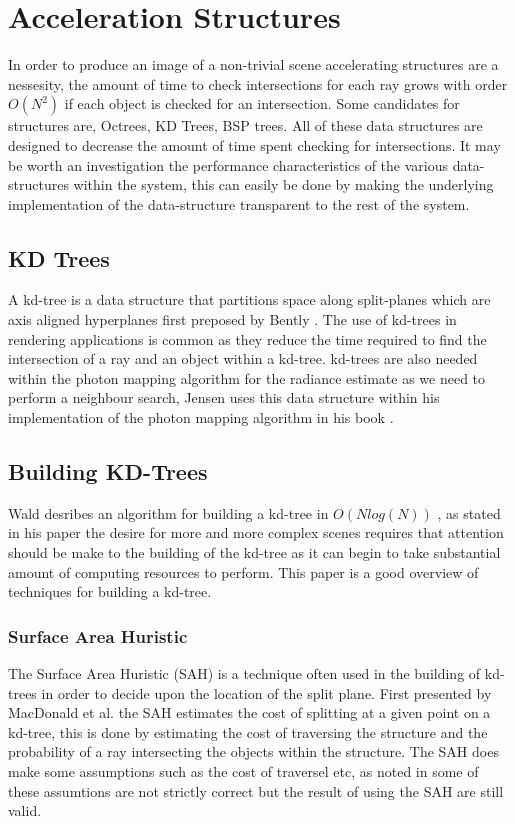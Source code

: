 \section{Acceleration Structures}
In order to produce an image of a non-trivial scene accelerating structures are a nessesity, the
amount of time to check intersections for each ray grows with order  $O(N^2)$ if each object is
checked for an intersection. Some candidates for structures are, Octrees, KD Trees, BSP trees. All
of these data structures are designed to decrease the amount of time spent checking for 
intersections. It may be worth an investigation the performance characteristics of the various
data-structures within the system, this can easily be done by making the underlying implementation
of the data-structure transparent to the rest of the system.

\subsection{KD Trees}
A kd-tree is a data structure that partitions space along split-planes which are axis aligned
hyperplanes first preposed by Bently \cite{Bently75}.
The use of kd-trees in rendering applications is common as they reduce the time
required to find the intersection of a ray and an object within a kd-tree. kd-trees are also needed
within the photon mapping algorithm for the radiance estimate as we need to perform a
neighbour search, Jensen uses this data structure within his implementation of the photon mapping
algorithm in his book \cite{JensenBook}.

\subsection{Building KD-Trees}
Wald desribes an algorithm for building a kd-tree in $O(N log(N))$ \cite{Wald06}, as stated in his
paper the desire for more and more complex scenes requires that attention should be make to the 
building of the kd-tree as it can begin to take substantial amount of computing resources to
perform. This paper is a good overview of techniques for building a kd-tree.

\subsubsection{Surface Area Huristic}
The Surface Area Huristic (SAH) is a technique often used in the building of kd-trees in order to
decide upon the location of the split plane. First presented by MacDonald et al. \cite{MacDonald90}
the SAH estimates the cost of splitting at a given point on a kd-tree, this is done by estimating the
cost of traversing the structure and the probability of a ray intersecting the objects within the
structure. The SAH does make some assumptions such as the cost of traversel etc, as noted in
\cite{Wald06} some of these assumtions are not strictly correct but the result of using the SAH
are still valid.

